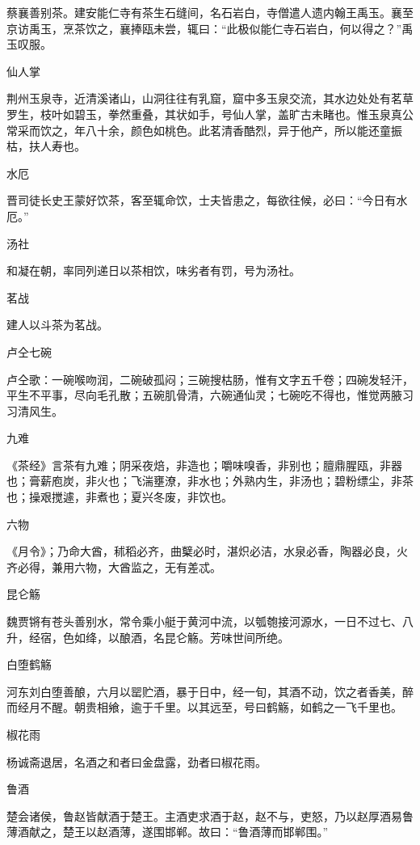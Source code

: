 \documentclass[a4paper,12pt,UTF8,twoside]{ctexbook}
\begin{document}
    蔡襄善别茶。建安能仁寺有茶生石缝间，名石岩白，寺僧遣人遗内翰王禹玉。襄至京访禹玉，烹茶饮之，襄捧瓯未尝，辄曰：“此极似能仁寺石岩白，何以得之？”禹玉叹服。
    
    仙人掌
    
    荆州玉泉寺，近清溪诸山，山洞往往有乳窟，窟中多玉泉交流，其水边处处有茗草罗生，枝叶如碧玉，拳然重叠，其状如手，号仙人掌，盖旷古未睹也。惟玉泉真公常采而饮之，年八十余，颜色如桃色。此茗清香酷烈，异于他产，所以能还童振枯，扶人寿也。
    
    水厄
    
    晋司徒长史王蒙好饮茶，客至辄命饮，士夫皆患之，每欲往候，必曰：“今日有水厄。”
    
    汤社
    
    和凝在朝，率同列递日以茶相饮，味劣者有罚，号为汤社。
    
    茗战
    
    建人以斗茶为茗战。
    
    卢仝七碗
    
    卢仝歌：一碗喉吻润，二碗破孤闷；三碗搜枯肠，惟有文字五千卷；四碗发轻汗，平生不平事，尽向毛孔散；五碗肌骨清，六碗通仙灵；七碗吃不得也，惟觉两腋习习清风生。
    
    九难
    
    《茶经》言茶有九难；阴采夜焙，非造也；嚼味嗅香，非别也；膻鼎腥瓯，非器也；膏薪庖炭，非火也；飞湍壅潦，非水也；外熟内生，非汤也；碧粉缥尘，非茶也；操艰搅遽，非煮也；夏兴冬废，非饮也。
    
    六物
    
    《月令》；乃命大酋，秫稻必齐，曲櫱必时，湛炽必洁，水泉必香，陶器必良，火齐必得，兼用六物，大酋监之，无有差忒。
    
    昆仑觞
    
    魏贾锵有苍头善别水，常令乘小艇于黄河中流，以瓠匏接河源水，一日不过七、八升，经宿，色如绛，以酿酒，名昆仑觞。芳味世间所绝。
    
    白堕鹤觞
    
    河东刘白堕善酿，六月以罂贮酒，暴于日中，经一旬，其酒不动，饮之者香美，醉而经月不醒。朝贵相飨，逾于千里。以其远至，号曰鹤觞，如鹤之一飞千里也。
    
    椒花雨
    
    杨诚斋退居，名酒之和者曰金盘露，劲者曰椒花雨。
    
    鲁酒
    
    楚会诸侯，鲁赵皆献酒于楚王。主酒吏求酒于赵，赵不与，吏怒，乃以赵厚酒易鲁薄酒献之，楚王以赵酒薄，遂围邯郸。故曰：“鲁酒薄而邯郸围。”
    
\end{document}
